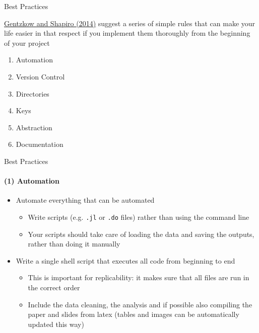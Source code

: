 \documentclass[10pt, aspectratio=169, xcolor=dvipsnames]{beamer}
\let\olditem\item
\renewcommand{\item}{%
\olditem\vspace{0.3em}}
\begin{document}
\begin{frame}[t]{Best Practices}

    \normalsize\vspace{0.5em} \href{https://web.stanford.edu/~gentzkow/research/CodeAndData.pdf}{Gentzkow and Shapiro (2014)} suggest a series of simple rules that can make your life easier in that respect if you implement them thoroughly from the beginning of your project
    \begin{enumerate}
        \item \alert{Automation}
        \item \alert{Version Control}
        \item \alert{Directories}
        \item \alert{Keys}
        \item \alert{Abstraction}
        \item \alert{Documentation}
    \end{enumerate}
\end{frame}

\begin{frame}[t]{Best Practices}
    \framesubtitle{(1) Automation}

    \normalsize\vspace{0.5em} \begin{itemize}
        \item Automate everything that can be automated \begin{itemize}
            \item Write scripts (e.g. \texttt{.jl} or \texttt{.do} files) rather than using the command line
            \item Your scripts should take care of loading the data and saving the outputs, rather than doing it manually
        \end{itemize}
        \item Write a single shell script that executes all code from beginning to end \begin{itemize}
            \item This is important for replicability: it makes sure that all files are run in the correct order
            \item Include the data cleaning, the analysis and if possible also compiling the paper and slides from latex (tables and images can be automatically updated this way)
        \end{itemize}
    \end{itemize}
\end{frame}
\end{document}
